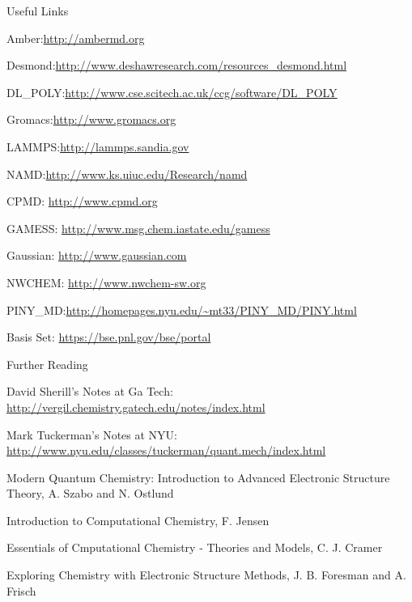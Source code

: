\documentclass[slidestop,mathserif,compress,xcolor=svgnames]{beamer}
\begin{document}
\begin{frame}[allowframebreaks]
\begin{block}{Useful Links}
\begin{itemize}
{\footnotesize\color{Blue}
\item{\color{tigerspurple}Amber:}\url{http://ambermd.org}
\item{\color{tigerspurple}Desmond:}\url{http://www.deshawresearch.com/resources_desmond.html}
\item{\color{tigerspurple}DL\_POLY:}\url{http://www.cse.scitech.ac.uk/ccg/software/DL_POLY}
\item{\color{tigerspurple}Gromacs:}\url{http://www.gromacs.org}
\item{\color{tigerspurple}LAMMPS:}\url{http://lammps.sandia.gov}
\item{\color{tigerspurple}NAMD:}\url{http://www.ks.uiuc.edu/Research/namd}
\item {\color{tigerspurple}CPMD:} \url{http://www.cpmd.org}
\item {\color{tigerspurple}GAMESS:} \url{http://www.msg.chem.iastate.edu/gamess}
\item {\color{tigerspurple}Gaussian:} \url{http://www.gaussian.com}
\item {\color{tigerspurple}NWCHEM:} \url{http://www.nwchem-sw.org}
\item{\color{tigerspurple}PINY\_MD:}\url{http://homepages.nyu.edu/~mt33/PINY_MD/PINY.html}
\item {\color{tigerspurple}Basis Set:} \url{https://bse.pnl.gov/bse/portal}
}
\end{itemize}
\end{block}
\begin{block}{\small Further Reading}
\begin{itemize}
{\scriptsize
\item David Sherill's Notes at Ga Tech: {\color{Blue}\url{http://vergil.chemistry.gatech.edu/notes/index.html}}
\item Mark Tuckerman's Notes at NYU: {\color{Blue}\url{http://www.nyu.edu/classes/tuckerman/quant.mech/index.html}}
\item Modern Quantum Chemistry: Introduction to Advanced Electronic Structure Theory, A. Szabo and N. Ostlund
\item Introduction to Computational Chemistry, F. Jensen
\item Essentials of Cmputational Chemistry - Theories and Models, C. J. Cramer
\item Exploring Chemistry with Electronic Structure Methods, J. B. Foresman and A. Frisch
}
\end{itemize}
\end{block}
\end{frame}
\end{document}
